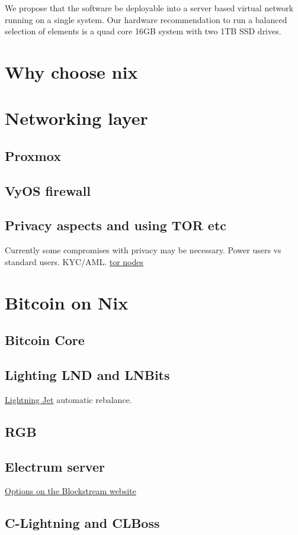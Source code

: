 We propose that the software be deployable into a server based virtual network running on a single system. Our hardware recommendation to run a balanced selection of elements is a quad core 16GB system with two 1TB SSD drives.
\section{Why choose nix}
\lipsum[50]
\section{Networking layer}
\lipsum[50]
\subsection{Proxmox}
\lipsum[50]
\subsection{VyOS firewall}
\lipsum[50]
\subsection{Privacy aspects and using TOR etc}
Currently some compromises with privacy may be necessary. Power users vs standard users. KYC/AML. 
\href{https://bitnodes.io/nodes/?q=.onion}{tor nodes}
\section{Bitcoin on Nix}
\lipsum[50]
\subsection{Bitcoin Core}
\lipsum[50]
\subsection{Lighting LND and LNBits}
\href{https://github.com/itsneski/lightning-jet}{Lightning Jet} automatic rebalance.
\subsection{RGB}
\lipsum[50]
\subsection{Electrum server}
\href{https://blog.blockstream.com/en-esplora-and-other-alternatives-to-electrumx/}{Options on the Blockstream website}
\lipsum[50]
\subsection{C-Lightning and CLBoss}

